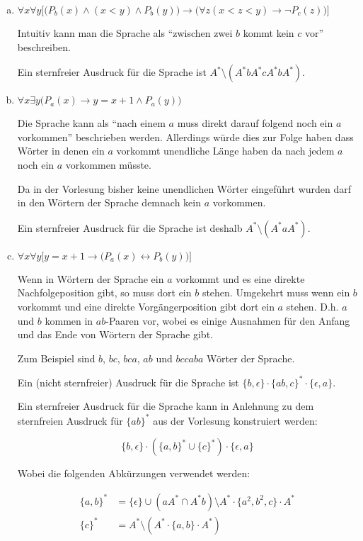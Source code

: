 \documentclass{scrartcl}
\begin{document}
\begin{enumerate}[(a)]
    \item $\forall x \forall y\Big[\big(P_b(x) \land (x < y) \land P_b(y)\big) \rightarrow \big(\forall z (x < z < y) \rightarrow \lnot P_c(z)\big)\Big]$

      Intuitiv kann man die Sprache als \enquote{zwischen zwei $b$ kommt kein $c$ vor} beschreiben.

      Ein sternfreier Ausdruck für die Sprache ist $A^* \setminus (A^* b A^* c A^* b A^*)$.

    \item $\forall x \exists y \Big( P_a(x) \rightarrow y = x+1 \land P_a(y)\Big)$

      Die Sprache kann als \enquote{nach einem $a$ muss direkt darauf folgend noch ein $a$ vorkommen} beschrieben werden. Allerdings würde dies zur Folge haben dass Wörter in denen ein $a$ vorkommt unendliche Länge haben da nach jedem $a$ noch ein $a$ vorkommen müsste.

      Da in der Vorlesung bisher keine unendlichen Wörter eingeführt wurden darf in den Wörtern der Sprache demnach kein $a$ vorkommen.

      Ein sternfreier Ausdruck für die Sprache ist deshalb $A^* \setminus (A^* a A^*)$.
    \item $\forall x \forall y \Big[ y = x+1 \rightarrow \big(P_a(x) \leftrightarrow P_b(y)\big)\Big]$

      Wenn in Wörtern der Sprache ein $a$ vorkommt und es eine direkte Nachfolgeposition gibt, so muss dort ein $b$ stehen. Umgekehrt muss wenn ein $b$ vorkommt und eine direkte Vorgängerposition gibt dort ein $a$ stehen. D.h. $a$ und $b$ kommen in $ab$-Paaren vor, wobei es einige Ausnahmen für den Anfang und das Ende von Wörtern der Sprache gibt.

      Zum Beispiel sind $b$, $bc$, $bca$, $ab$ und $bccaba$ Wörter der Sprache.

      Ein (nicht sternfreier) Ausdruck für die Sprache ist $\{b, \epsilon\} \cdot \{ab,c\}^* \cdot \{\epsilon, a\}$.

      Ein sternfreier Ausdruck für die Sprache kann in Anlehnung zu dem sternfreien Ausdruck für $\{ab\}^*$ aus der Vorlesung konstruiert werden:

      \begin{equation*}
        \{b, \epsilon\} \cdot (\{a,b\}^* \cup \{c\}^*) \cdot \{\epsilon, a\}
      \end{equation*}

      Wobei die folgenden Abkürzungen verwendet werden:

      \begin{align*}
        \{a,b\}^* &= \{\epsilon\} \cup (aA^* \cap A^*b) \setminus A^* \cdot \{a^2, b^2, c\} \cdot A^*\\
        \{c\}^* &= A^* \setminus (A^* \cdot \{a, b\} \cdot A^*)
      \end{align*}
\end{enumerate}
\end{document}
